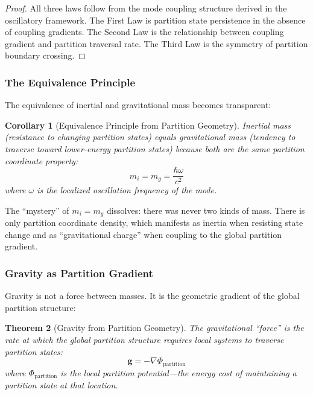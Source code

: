\documentclass[twocolumn,10pt,a4paper]{article}
\newtheorem{theorem}{Theorem}[section]
\newtheorem{corollary}[theorem]{Corollary}
\theoremstyle{definition}
\theoremstyle{remark}
\begin{document}
\begin{proof}
All three laws follow from the mode coupling structure derived in the oscillatory framework. The First Law is partition state persistence in the absence of coupling gradients. The Second Law is the relationship between coupling gradient and partition traversal rate. The Third Law is the symmetry of partition boundary crossing.
\end{proof}

\subsubsection{The Equivalence Principle}

The equivalence of inertial and gravitational mass becomes transparent:

\begin{corollary}[Equivalence Principle from Partition Geometry]
\label{cor:equivalence}
Inertial mass (resistance to changing partition states) equals gravitational mass (tendency to traverse toward lower-energy partition states) because both are the \emph{same} partition coordinate property:
\begin{equation}
    m_i = m_g = \frac{\hbar \omega}{c^2}
\end{equation}
where $\omega$ is the localized oscillation frequency of the mode.
\end{corollary}

The ``mystery'' of $m_i = m_g$ dissolves: there was never two kinds of mass. There is only partition coordinate density, which manifests as inertia when resisting state change and as ``gravitational charge'' when coupling to the global partition gradient.

\subsubsection{Gravity as Partition Gradient}

Gravity is not a force between masses. It is the geometric gradient of the global partition structure:

\begin{theorem}[Gravity from Partition Geometry]
\label{thm:gravity_partition}
The gravitational ``force'' is the rate at which the global partition structure requires local systems to traverse partition states:
\begin{equation}
    \mathbf{g} = -\nabla \Phi_{\text{partition}}
\end{equation}
where $\Phi_{\text{partition}}$ is the local partition potential---the energy cost of maintaining a partition state at that location.
\end{theorem}
\end{document}
